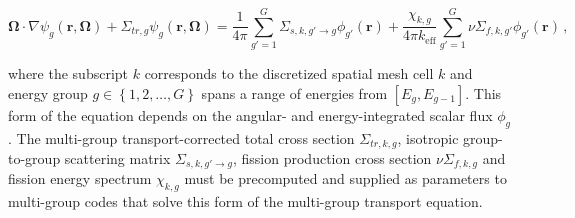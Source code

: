 \begin{equation}
\label{eqn:transport-mg}
\mathbf{\Omega} \cdot \nabla \psi_{g}(\mathbf{r},\mathbf{\Omega}) + \Sigma_{tr,g}\psi_{g}(\mathbf{r},\mathbf{\Omega}) = \frac{1}{4\pi} \sum_{g'=1}^{G} \Sigma_{s,k,g' \rightarrow g}\phi_{g'}(\mathbf{r}) + \frac{\chi_{k,g}}{4\pi k_{\textrm{eff}}}\sum_{g'=1}^{G} \nu\Sigma_{f,k,g'}\phi_{g'}(\mathbf{r})\,,
\end{equation}

\noindent where the subscript $k$ corresponds to the discretized spatial mesh cell $k$ and energy group $g \in \left\{1, 2, \ldots, G\right\}$ spans a range of energies from $\left[E_{g}, E_{g-1}\right]$. This form of the equation depends on the angular- and energy-integrated scalar flux $\phi_g$. The multi-group transport-corrected total cross section $\Sigma_{tr,k,g}$, isotropic group-to-group scattering matrix $\Sigma_{s,k,g'\rightarrow g}$, fission production cross section $\nu\Sigma_{f,k,g}$ and fission energy spectrum $\chi_{k,g}$ must be precomputed and supplied as parameters to multi-group codes that solve this form of the multi-group transport equation.
